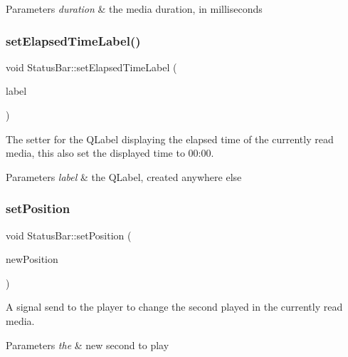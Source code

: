 \begin{DoxyParams}{Parameters}
{\em duration} & the media duration, in milliseconds \\
\hline
\end{DoxyParams}
\mbox{\label{classStatusBar_a285ff0279e3f9d5b677d83ce236f6d25}} 
\subsubsection{\texorpdfstring{set\+Elapsed\+Time\+Label()}{setElapsedTimeLabel()}}
{\footnotesize\ttfamily void Status\+Bar\+::set\+Elapsed\+Time\+Label (\begin{DoxyParamCaption}\item[{Q\+Label $\ast$}]{label }\end{DoxyParamCaption})}



The setter for the Q\+Label displaying the elapsed time of the currently read media, this also set the displayed time to 00\+:00. 


\begin{DoxyParams}{Parameters}
{\em label} & the Q\+Label, created anywhere else \\
\hline
\end{DoxyParams}
\mbox{\label{classStatusBar_adf37ac3b2bf684e9d9d53c8ea345b0b9}} 
\subsubsection{\texorpdfstring{set\+Position}{setPosition}}
{\footnotesize\ttfamily void Status\+Bar\+::set\+Position (\begin{DoxyParamCaption}\item[{qint64}]{new\+Position }\end{DoxyParamCaption})\hspace{0.3cm}{\ttfamily [signal]}}



A signal send to the player to change the second played in the currently read media. 


\begin{DoxyParams}{Parameters}
{\em the} & new second to play \\
\hline
\end{DoxyParams}
\mbox{\label{classStatusBar_af8e70f7ce434b29b04a5aaced2dd05ae}} 
